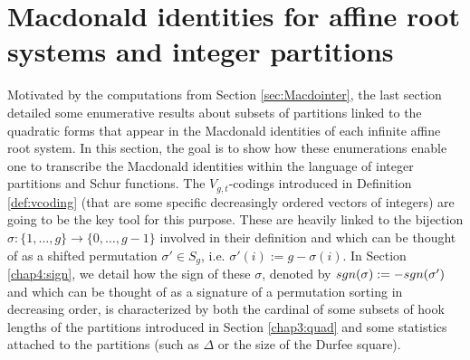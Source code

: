 \documentclass[11pt,letterpaper]{amsart}
\def\bbbz{\mathbb Z}
\def\cch{\mathcal H}
\def\ccsc{\mathcal {SC}}
\def\sgn{{\rm sgn}}
\newtheorem{thm}[df]{Theorem}
\numberwithin{equation}{section}
\numberwithin{df}{section}
\begin{document}
%


 
\section{Macdonald identities for affine root systems and integer partitions}\label{chap4:macdo}
%


Motivated by the computations from Section \ref{sec:Macdointer}, the last section detailed some enumerative results about subsets of partitions linked to the quadratic forms that appear in the Macdonald identities of each infinite affine root system. In this section, the goal is to show how these enumerations enable one to transcribe the Macdonald identities within the language of integer partitions and Schur functions. The $V_{g,t}$-codings introduced in Definition \ref{def:vcoding} (that are some specific decreasingly ordered vectors of integers) are going to be the key tool for this purpose. These are heavily linked to the bijection $\sigma : \lbrace 1,\dots,g\rbrace\rightarrow \lbrace 0,\dots,g-1\rbrace $ involved in their definition and which can be thought of as a shifted permutation $\sigma'\in S_{g}$, i.e. $\sigma'(i):=g-\sigma(i)$. In Section \ref{chap4:sign}, we detail how the sign of these $\sigma$, denoted by $\sgn(\sigma):=-\sgn(\sigma')$ and which can be thought of as a signature of a permutation sorting in decreasing order, is characterized by both the cardinal of some subsets of hook lengths of the partitions introduced in Section \ref{chap3:quad} and some statistics attached to the partitions (such as $\Delta$ or the size of the Durfee square). 
\end{document}
